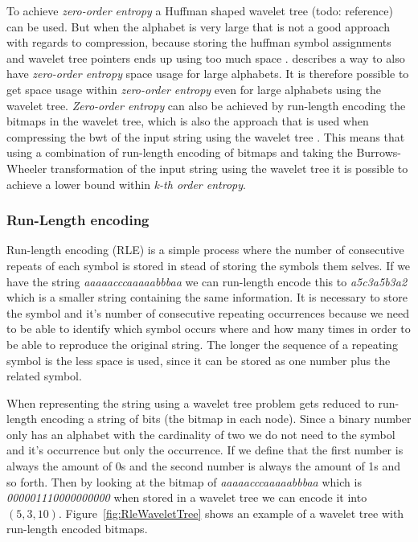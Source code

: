 To achieve \textit{zero-order entropy} a Huffman shaped wavelet tree (todo: reference) can be used. But when the alphabet is very large that is not a good approach with regards to compression, because storing the huffman symbol assignments and wavelet tree pointers ends up using too much space . \citep[Section~3]{Claude08practicalrankselect} describes a way to also have \textit{zero-order entropy} space usage for large alphabets. 
It is therefore possible to get space usage within \textit{zero-order entropy} even for large alphabets using the wavelet tree. 
\textit{Zero-order entropy} can also be achieved by run-length encoding the bitmaps in the wavelet tree, which is also the approach that is used when compressing the bwt of the input string using the wavelet tree \citep[Introduction (\textbf{B})]{waveletTreeEntropy}.
This means that using a combination of run-length encoding of bitmaps and taking the Burrows-Wheeler transformation of the input string using the wavelet tree it is possible to achieve a lower bound within \textit{k-th order entropy}.

\subsubsection{Run-Length encoding}
Run-length encoding (RLE) is a simple process where the number of consecutive repeats of each symbol is stored in stead of storing the symbols them selves. 
If we have the string \textit{aaaaacccaaaaabbbaa} we can run-length encode this to \textit{a5c3a5b3a2} which is a smaller string containing the same information.
It is necessary to store the symbol and it's number of consecutive repeating occurrences because we need to be able to identify which symbol occurs where and how many times in order to be able to reproduce the original string.
The longer the sequence of a repeating symbol is the less space is used, since it can be stored as one number plus the related symbol.

When representing the string using a wavelet tree problem gets reduced to run-length encoding a string of bits (the bitmap in each node).
Since a binary number only has an alphabet with the cardinality of two we do not need to the symbol and it's occurrence but only the occurrence.
If we define that the first number is always the amount of 0s and the second number is always the amount of 1s and so forth. 
Then by looking at the bitmap of \textit{aaaaacccaaaaabbbaa} which is \textit{000001110000000000} when stored in a wavelet tree we can encode it into $(5,3,10)$.
Figure~\ref{fig:RleWaveletTree} shows an example of a wavelet tree with run-length encoded bitmaps.

